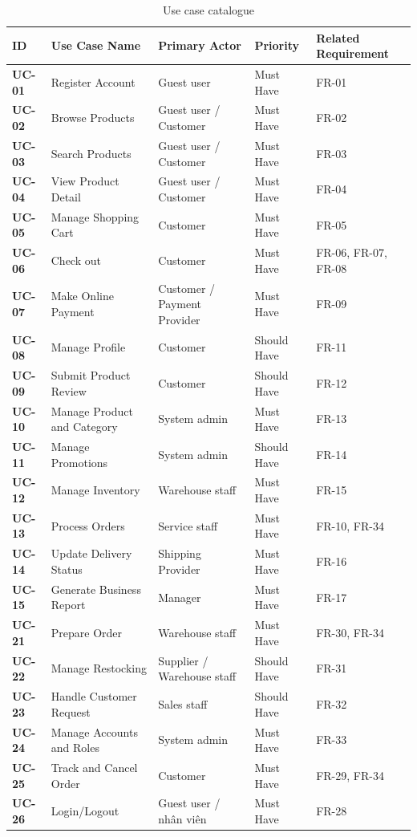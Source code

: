 \documentclass[12pt,a4paper,oneside]{report}
\begin{document}
\begin{longtable}{p{1.6cm}p{4.8cm}p{3.8cm}p{2.6cm}p{2.8cm}}
\caption{Use case catalogue}\\
\toprule
\textbf{ID} & \textbf{Use Case Name} & \textbf{Primary Actor} & \textbf{Priority} & \textbf{Related Requirement} \\
\midrule
\endhead
\bottomrule
\endlastfoot
\textbf{UC-01} & Register Account & Guest user & Must Have & FR-01 \\
\textbf{UC-02} & Browse Products & Guest user / Customer & Must Have & FR-02 \\
\textbf{UC-03} & Search Products & Guest user / Customer & Must Have & FR-03 \\
\textbf{UC-04} & View Product Detail & Guest user / Customer & Must Have & FR-04 \\
\textbf{UC-05} & Manage Shopping Cart & Customer & Must Have & FR-05 \\
\textbf{UC-06} & Check out & Customer & Must Have & FR-06, FR-07, FR-08 \\
\textbf{UC-07} & Make Online Payment & Customer / Payment Provider & Must Have & FR-09 \\
\textbf{UC-08} & Manage Profile & Customer & Should Have & FR-11 \\
\textbf{UC-09} & Submit Product Review & Customer & Should Have & FR-12 \\
\textbf{UC-10} & Manage Product and Category & System admin & Must Have & FR-13 \\
\textbf{UC-11} & Manage Promotions & System admin & Should Have & FR-14 \\
\textbf{UC-12} & Manage Inventory & Warehouse staff & Must Have & FR-15 \\
\textbf{UC-13} & Process Orders & Service staff & Must Have & FR-10, FR-34 \\
\textbf{UC-14} & Update Delivery Status & Shipping Provider & Must Have & FR-16 \\
\textbf{UC-15} & Generate Business Report & Manager & Must Have & FR-17 \\
\textbf{UC-21} & Prepare Order & Warehouse staff & Must Have & FR-30, FR-34 \\
\textbf{UC-22} & Manage Restocking & Supplier / Warehouse staff & Should Have & FR-31 \\
\textbf{UC-23} & Handle Customer Request & Sales staff & Should Have & FR-32 \\
\textbf{UC-24} & Manage Accounts and Roles & System admin & Must Have & FR-33 \\
\textbf{UC-25} & Track and Cancel Order & Customer & Must Have & FR-29, FR-34 \\
\textbf{UC-26} & Login/Logout & Guest user / nhân viên & Must Have & FR-28 \\
\end{longtable}
\end{document}
